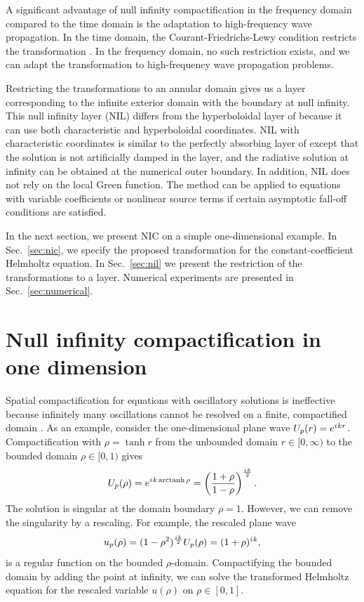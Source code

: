 \documentclass[draft,onefignum,onetabnum]{siamart190516}
\newcommand{\be}{\begin{equation}}
\newcommand{\ee}{\end{equation}}
\newcommand{\iu}{{i\mkern1mu}}
\DeclareMathOperator\arctanh{arctanh}
\begin{document}
A significant advantage of null infinity compactification in the frequency domain compared to the time domain is the adaptation to high-frequency wave propagation. In the time domain, the Courant-Friedrichs-Lewy condition restricts the transformation \cite{ZENGINOGLU20112286}. In the frequency domain, no such restriction exists, and we can adapt the transformation to high-frequency wave propagation problems. 

Restricting the transformations to an annular domain gives us a layer corresponding to the infinite exterior domain with the boundary at null infinity. This null infinity layer (NIL) differs from the hyperboloidal layer of \cite{ZENGINOGLU20112286} because it can use both characteristic and hyperboloidal coordinates. NIL with characteristic coordinates is similar to the perfectly absorbing layer of \cite{wang2017perfect, yang2021truly} except that the solution is not artificially damped in the layer, and the radiative solution at infinity can be obtained at the numerical outer boundary. In addition, NIL does not rely on the local Green function. The method can be applied to equations with variable coefficients or nonlinear source terms if certain asymptotic fall-off conditions are satisfied. 

In the next section, we present NIC on a simple one-dimensional example. In Sec.~\ref{sec:nic}, we specify the proposed transformation for the constant-coefficient Helmholtz equation. In Sec.~\ref{sec:nil} we present the restriction of the transformations to a layer. Numerical experiments are presented in Sec.~\ref{sec:numerical}. 

\section{Null infinity compactification in one dimension}\label{sec:nic1d}
Spatial compactification for equations with oscillatory solutions is ineffective because infinitely many oscillations cannot be resolved on a finite, compactified domain \cite{GroschOrszag77, shen2014approximations}. As an example, consider the one-dimensional plane wave $U_p(r) = e^{\iu k r}$. Compactification with $\rho=\tanh r$ from the unbounded domain $r\in[0,\infty)$ to the bounded domain $\rho\in[0,1)$ gives
\[ U_p(\rho) =   e^{\iu k \arctanh\rho} = \left(\frac{1+\rho}{1-\rho}\right)^{\frac{\iu k}{2}}.\]
The solution is singular at the domain boundary $\rho=1$. However, we can remove the singularity by a rescaling. For example, the rescaled plane wave
\be\label{eq:plane_tanh} u_p(\rho) =  (1-\rho^2)^{\frac{\iu k}{2}} U_p(\rho) = (1+\rho)^{\iu k}, \ee
is a regular function on the bounded $\rho$-domain. Compactifying the bounded domain by adding the point at infinity, we can solve the transformed Helmholtz equation for the rescaled variable $u(\rho)$ on $\rho\in[0,1]$. 
\end{document}
